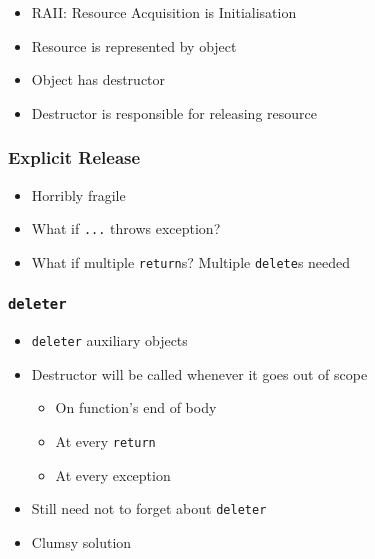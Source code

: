 \documentclass{../ucll-slides}
\begin{document}
\begin{frame}
  \frametitle{\cpp}
  \begin{itemize}
    \item RAII: Resource Acquisition is Initialisation
    \item Resource is represented by object
    \item Object has destructor
    \item Destructor is responsible for releasing resource
  \end{itemize}
\end{frame}

\begin{frame}
  \frametitle{Explicit Release}
  \begin{itemize}
    \item Horribly fragile
    \item What if {\tt ...} throws exception?
    \item What if multiple {\tt return}s? Multiple {\tt delete}s needed
  \end{itemize}
\end{frame}

\begin{frame}
\end{frame}

\begin{frame}
  \frametitle{\tt deleter}
  \begin{itemize}
    \item {\tt deleter} auxiliary objects
    \item Destructor will be called whenever it goes out of scope
          \begin{itemize}
            \item On function's end of body
            \item At every {\tt return}
            \item At every exception
          \end{itemize}
    \item Still need not to forget about {\tt deleter}
    \item Clumsy solution
  \end{itemize}
\end{frame}

\begin{frame}
\end{frame}
\end{document}
